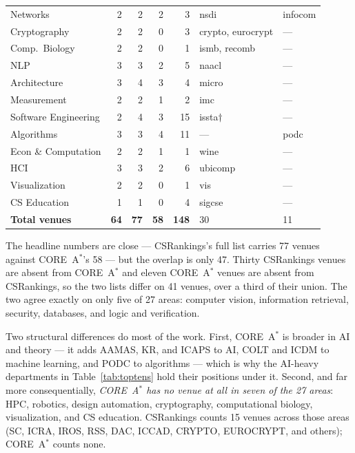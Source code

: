 \documentclass[11pt]{article}
\newcommand{\csr}{CSRankings}
\begin{document}
\begin{table}[t]
\begin{tabular}{lrrrr ll}
Networks              & 2 & 2 & 2 & 3  & nsdi                                         & infocom \\
Cryptography          & 2 & 2 & 0 & 3  & crypto, eurocrypt                            & --- \\
Comp.\ Biology        & 2 & 2 & 0 & 1  & ismb, recomb                                 & --- \\
NLP                   & 3 & 3 & 2 & 5  & naacl                                        & --- \\
Architecture          & 3 & 4 & 3 & 4  & micro                                        & --- \\
Measurement           & 2 & 2 & 1 & 2  & imc                                          & --- \\
Software Engineering  & 2 & 4 & 3 & 15 & issta$\dagger$                               & --- \\
Algorithms            & 3 & 3 & 4 & 11 & ---                                          & podc \\
Econ \& Computation   & 2 & 2 & 1 & 1  & wine                                         & --- \\
HCI                   & 3 & 3 & 2 & 6  & ubicomp                                      & --- \\
Visualization         & 2 & 2 & 0 & 1  & vis                                          & --- \\
CS Education          & 1 & 1 & 0 & 4  & sigcse                                       & --- \\
\midrule
\textbf{Total venues} & \textbf{64} & \textbf{77} & \textbf{58} & \textbf{148} & 30 & 11 \\
\bottomrule
\end{tabular}
\end{table}

The headline numbers are close --- \csr{}'s full list carries 77 venues against
CORE~A$^*$'s 58 --- but the overlap is only 47. Thirty \csr{} venues are absent
from CORE~A$^*$ and eleven CORE~A$^*$ venues are absent from \csr{}, so the two
lists differ on 41 venues, over a third of their union. The two agree exactly
on only five of 27 areas: computer vision, information retrieval, security,
databases, and logic and verification.

Two structural differences do most of the work. First, CORE~A$^*$ is broader in
AI and theory --- it adds AAMAS, KR, and ICAPS to AI, COLT and ICDM to machine
learning, and PODC to algorithms --- which is why the AI-heavy departments in
Table~\ref{tab:toptens} hold their positions under it. Second, and far more
consequentially, \emph{CORE~A$^*$ has no venue at all in seven of the 27 areas}:
HPC, robotics, design automation, cryptography, computational biology,
visualization, and CS education. \csr{} counts 15 venues across those areas
(SC, ICRA, IROS, RSS, DAC, ICCAD, CRYPTO, EUROCRYPT, and others); CORE~A$^*$
counts none.
\end{document}
